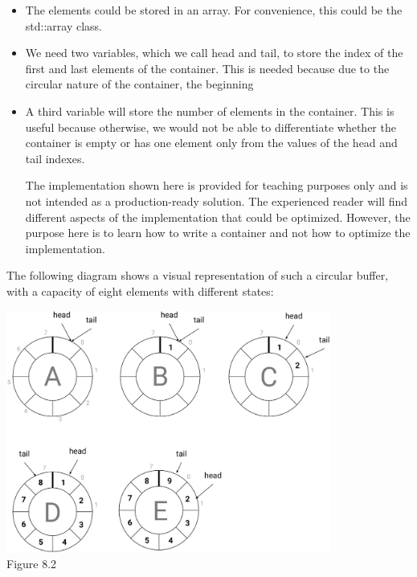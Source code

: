 \begin{itemize}
\item
The elements could be stored in an array. For convenience, this could be the std::array class.

\item
We need two variables, which we call head and tail, to store the index of the first and last elements of the container. This is needed because due to the circular nature of the container, the beginning

\item
A third variable will store the number of elements in the container. This is useful because otherwise, we would not be able to differentiate whether the container is empty or has one element only from the values of the head and tail indexes.

\begin{tcolorbox}[breakable,enhanced jigsaw,colback=blue!5!white,colframe=blue!75!black,title={Important Note}]
The implementation shown here is provided for teaching purposes only and is not intended as a production-ready solution. The experienced reader will find different aspects of the implementation that could be optimized. However, the purpose here is to learn how to write a container and not how to optimize the implementation.
\end{tcolorbox}

\end{itemize}

The following diagram shows a visual representation of such a circular buffer, with a capacity of eight elements with different states:

\begin{center}
\includegraphics[width=0.8\textwidth]{content/3/chapter8/images/2.png}\\
Figure 8.2
\end{center}

